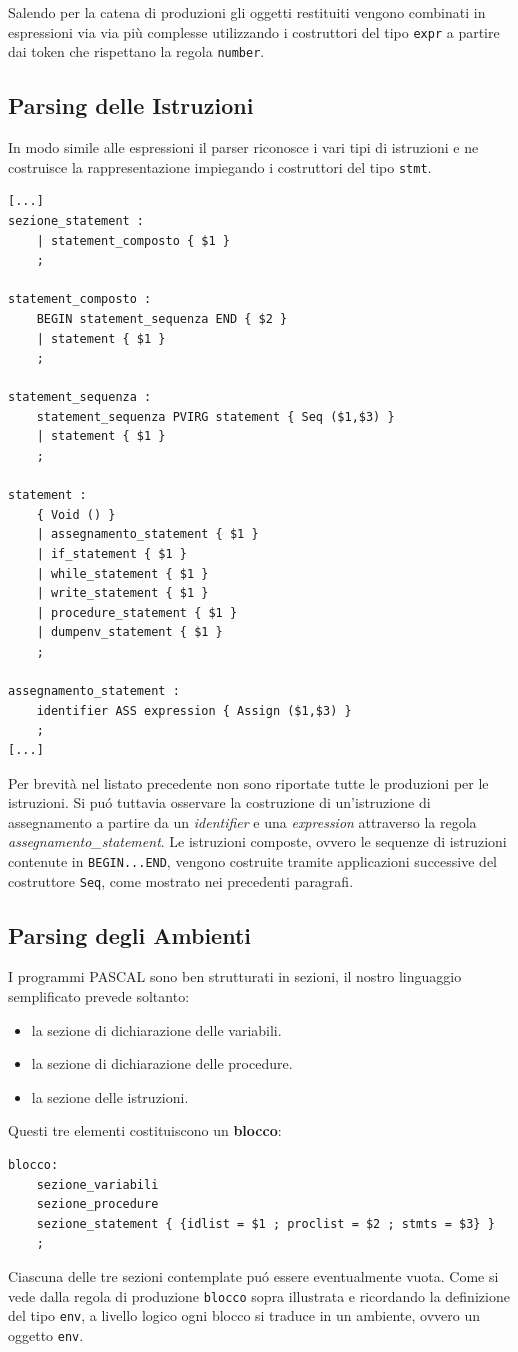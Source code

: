 \documentclass[a4paper,10pt]{article}
\begin{document}
Salendo per la catena di produzioni gli oggetti restituiti vengono combinati in
espressioni via via pi\`u complesse utilizzando i costruttori del tipo 
\verb|expr| a partire dai token che rispettano la regola \texttt{number}.

\subsection{Parsing delle Istruzioni}
In modo simile alle espressioni il parser riconosce i vari tipi di istruzioni e 
ne costruisce la rappresentazione impiegando i costruttori del tipo \verb|stmt|.
\begin{verbatim}
[...]
sezione_statement :
    | statement_composto { $1 } 
    ;

statement_composto :
    BEGIN statement_sequenza END { $2 } 
    | statement { $1 }
    ;

statement_sequenza : 
    statement_sequenza PVIRG statement { Seq ($1,$3) }
    | statement { $1 }
    ;

statement : 
    { Void () }
    | assegnamento_statement { $1 }
    | if_statement { $1 }
    | while_statement { $1 }
    | write_statement { $1 }
    | procedure_statement { $1 }
    | dumpenv_statement { $1 }
    ;

assegnamento_statement : 
    identifier ASS expression { Assign ($1,$3) }
    ;
[...]
\end{verbatim}

Per brevit\`a nel listato precedente non sono riportate tutte le produzioni per
le istruzioni. Si pu\'o tuttavia osservare la costruzione di un'istruzione di
assegnamento a partire da un \textit{identifier} e una \textit{expression}
attraverso la regola \textit{assegnamento\_statement}. Le istruzioni composte,
ovvero le sequenze di istruzioni contenute in \texttt{BEGIN...END}, vengono
costruite tramite applicazioni successive del costruttore \texttt{Seq}, come
mostrato nei precedenti paragrafi.

\subsection{Parsing degli Ambienti}
I programmi PASCAL sono ben strutturati in sezioni, il nostro
linguaggio semplificato prevede soltanto: 
\begin{itemize}
 \item la sezione di dichiarazione delle variabili.
 \item la sezione di dichiarazione delle procedure.
 \item la sezione delle istruzioni.
\end{itemize}
Questi tre elementi costituiscono un \textbf{blocco}: 
\begin{verbatim}
blocco:
    sezione_variabili
    sezione_procedure
    sezione_statement { {idlist = $1 ; proclist = $2 ; stmts = $3} }
    ;
\end{verbatim}
Ciascuna delle tre sezioni contemplate pu\'o essere eventualmente vuota.
Come si vede dalla regola di produzione \texttt{blocco} sopra illustrata e
ricordando la definizione del tipo \texttt{env}, a livello logico ogni blocco si
traduce in un ambiente, ovvero un oggetto \texttt{env}.
\end{document}
